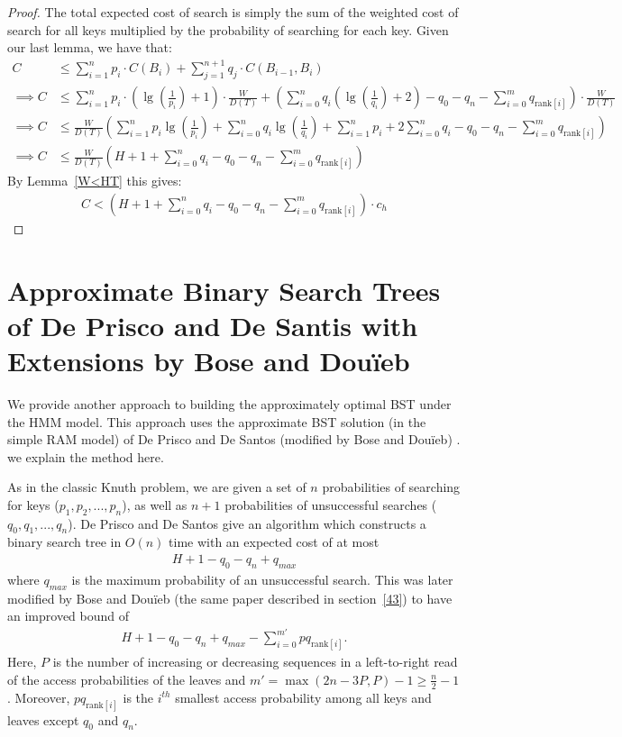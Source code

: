\documentclass[letterpaper,12pt,titlepage,oneside,final]{book}
\theoremstyle{plain}
\begin{document}
\begin{proof}
The total expected cost of search is simply the sum of the weighted cost of search for all keys multiplied by the probability of searching for each key. Given our last lemma, we have that:
\begin{align*}
C &\leq \sum_{i=1}^{n} p_i\cdot C(B_i) + \sum_{j=1}^{n+1} q_j\cdot C(B_{i-1},B_i) \\
\implies C &\leq \sum_{i=1}^{n} p_i\cdot (\lg(\frac{1}{p_i})+1)\cdot \frac{W}{D(T)} + \left(\sum_{i=0}^{n} q_i(\lg(\frac{1}{q_i})+2) - q_0 - q_n -  \sum_{i=0}^m q_{\text{rank}[i]} \right)\cdot \frac{W}{D(T)} \\
\implies C &\leq \frac{W}{D(T)} \left(\sum_{i=1}^{n} p_i\lg(\frac{1}{p_i}) + \sum_{i=0}^{n} q_i\lg(\frac{1}{q_i}) + \sum_{i=1}^{n} p_i + 2\sum_{i=0}^{n} q_i - q_0 - q_n - \sum_{i=0}^m q_{\text{rank}[i]} \right) \\
\implies C &\leq  \frac{W}{D(T)} \left(H + 1 + \sum_{i=0}^n q_i - q_0 - q_n - \sum_{i=0}^m q_{\text{rank}[i]} \right)
\end{align*}
By Lemma~\ref{W<HT} this gives:
\begin{align*}
C < \left(H + 1 + \sum_{i=0}^n q_i - q_0 - q_n - \sum_{i=0}^m q_{\text{rank}[i]} \right) \cdot  c_h
\end{align*}

\end{proof}


\section{Approximate Binary Search Trees of De Prisco and De Santis with Extensions by Bose and Dou\"{i}eb} \label{sec:deBST}

We provide another approach to building the approximately optimal BST under the HMM model. This approach uses the approximate BST solution (in the simple RAM model) of De Prisco and De Santos (modified by Bose and Dou\"{i}eb) \cite{de1993binary, bose2009efficient}. we explain the method here.

As in the classic Knuth problem, we are given a set of $n$ probabilities of searching for keys ($p_1, p_2, ..., p_n$), as well as $n+1$ probabilities of unsuccessful searches ($q_0, q_1, ..., q_n$). De Prisco and De Santos give an algorithm which constructs a binary search tree in $O(n)$ time with an expected cost of at most \cite{de1993binary}
\begin{align*}
H+1-q_0-q_n+q_{max}
\end{align*}
  where $q_{max}$ is the maximum probability of an unsuccessful search. This was later modified by Bose and Dou\"{i}eb (the same paper described in section~\ref{43}) to have an improved bound of \cite{bose2009efficient}
\begin{align*}
H + 1 - q_0 - q_n + q_{max} - \sum_{i=0}^{m'} pq_{\text{rank}[i]}.
\end{align*}
Here, $P$ is the number of increasing or decreasing sequences in a left-to-right read of the access probabilities of the leaves and $m'=\max({2n-3P,P})-1 \geq \frac{n}{2} - 1$.  Moreover, $pq_{\text{rank}[i]}$ is the $i^{th}$ smallest access probability among all keys and leaves except $q_0$ and $q_n$.
\end{document}

